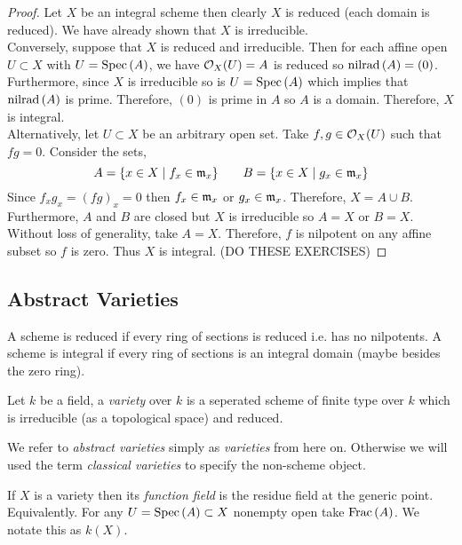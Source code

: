 \documentclass[12pt]{article}
\begin{document}
\begin{proof}
Let $X$ be an integral scheme then clearly $X$ is reduced (each domain is reduced). We have already shown that $X$ is irreducible.
\bigskip\\
Conversely, suppose that $X$ is reduced and irreducible. Then for each affine open $U \subset X$ with $U = \mathrm{Spec}\left( A \right)$, we have $\mathcal{O}_{X}(U) = A$ is reduced so $\mathrm{nilrad}\left( A \right) = (0)$. Furthermore, since $X$ is irreducible so is $U = \mathrm{Spec}\left( A \right)$ which implies that $\mathrm{nilrad}\left( A \right)$ is prime. Therefore, $(0)$ is prime in $A$ so $A$ is a domain. Therefore, $X$ is integral. 
\bigskip\\
Alternatively, let $U \subset X$ be an arbitrary open set. Take $f, g \in \mathcal{O}_{X}(U)$ such that $fg = 0$. Consider the sets,
\[ A = \{ x \in X \mid f_x \in \mathfrak{m}_x \} \quad \quad B = \{ x \in X \mid g_x \in \mathfrak{m}_x \} \]
Since $f_x g_x = (fg)_x = 0$ then $f_x \in \mathfrak{m}_x$ or $g_x \in \mathfrak{m}_x$. Therefore, $X = A \cup B$. Furthermore, $A$ and $B$ are closed but $X$ is irreducible so $A = X$ or $B = X$. Without loss of generality, take $A = X$. Therefore, $f$ is nilpotent on any affine subset so $f$ is zero. Thus $X$ is integral. (DO THESE EXERCISES)
\end{proof}



\subsection{Abstract Varieties}

\begin{definition}
A scheme is reduced if every ring of sections is reduced i.e. has no nilpotents. A scheme is integral if every ring of sections is an integral domain (maybe besides the zero ring). 
\end{definition}

\begin{definition}
Let $k$ be a field, a \textit{variety} over $k$ is a seperated scheme of finite type over $k$ which is irreducible (as a topological space) and reduced. 
\end{definition}

\begin{remark}
We refer to \textit{abstract varieties} simply as \textit{varieties} from here on. Otherwise we will used the term \textit{classical varieties} to specify the non-scheme object. 
\end{remark}


\begin{definition}
If $X$ is a variety then its \textit{function field} is the residue field at the generic point. Equivalently. For any $U = \mathrm{Spec}\left( A \right) \subset X$ nonempty open take $\mathrm{Frac}\left(A\right)$. We notate this as $k(X)$.  
\end{definition}
\end{document}
